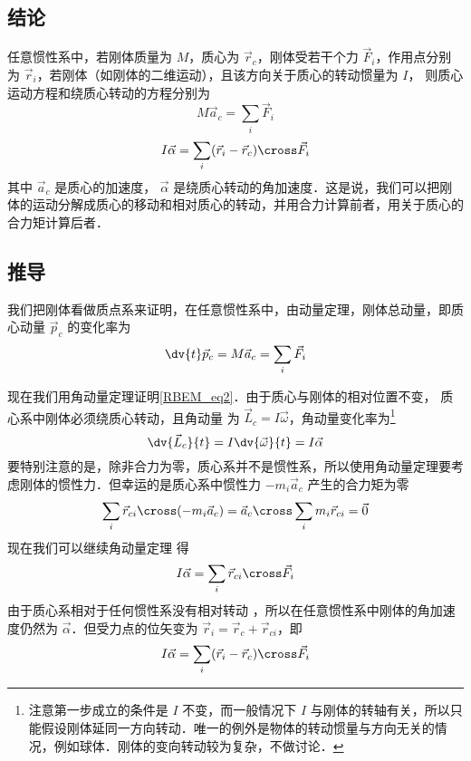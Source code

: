 

\subsection{结论}
任意惯性系中，若刚体质量为 $M$，质心为 $\vec r_c$，刚体受若干个力 $\vec F_i$，作用点分别为 $\vec r_i$，若刚体（如刚体的二维运动），且该方向关于质心的转动惯量为 $I$， 则质心运动方程和绕质心转动的方程分别为
\begin{equation}\label{RBEM_eq1}
M\vec a_c = \sum_i \vec F_i
\end{equation}
\begin{equation}\label{RBEM_eq2}
I \vec \alpha = \sum_i (\vec r_i-\vec r_c) \cross  \vec F_i
\end{equation}
其中 $\vec a_c$ 是质心的加速度， $\vec \alpha$ 是绕质心转动的角加速度．这是说，我们可以把刚体的运动分解成质心的移动和相对质心的转动，并用合力计算前者，用关于质心的合力矩计算后者．

\subsection{推导}
我们把刚体看做质点系来证明，在任意惯性系中，由动量定理，刚体总动量，即质心动量 $\vec p_c$ 的变化率为
\begin{equation}
\dv{t} \vec p_c = M \vec a_c = \sum_i \vec F_i
\end{equation}

现在我们用角动量定理证明\autoref{RBEM_eq2}．由于质心与刚体的相对位置不变，%
质心系中刚体必须绕质心转动，且角动量%
为 $\vec L_c = I \vec\omega$，角动量变化率为\footnote{注意第一步成立的条件是 $I$ 不变，而一般情况下 $I$ 与刚体的转轴有关，所以只能假设刚体延同一方向转动．唯一的例外是物体的转动惯量与方向无关的情况，例如球体．刚体的变向转动较为复杂，不做讨论．}
\begin{equation}
\dv{\vec L_c}{t} = I \dv{\vec \omega}{t} = I \vec\alpha
\end{equation}
要特别注意的是，除非合力为零，质心系并不是惯性系，所以使用角动量定理要考虑刚体的惯性力．但幸运的是质心系中惯性力%
 $-m_i \vec a_c$ 产生的合力矩为零%
\begin{equation}
\sum_i \vec r_{ci}\cross (-m_i \vec a_{c}) = \vec a_{c} \cross \sum_i m_i \vec r_{ci} = \vec 0
\end{equation}
现在我们可以继续角动量定理 得
\begin{equation}
I \vec\alpha = \sum_i \vec r_{ci} \cross  \vec F_i
\end{equation}
由于质心系相对于任何惯性系没有相对转动%
，所以在任意惯性系中刚体的角加速度仍然为 $\vec\alpha$．但受力点的位矢变为 $\vec r_i = \vec r_c + \vec r_{ci}$，即
\begin{equation}\label{RBEM_eq7}
I \vec \alpha = \sum_i (\vec r_i-\vec r_c) \cross  \vec F_i
\end{equation}

